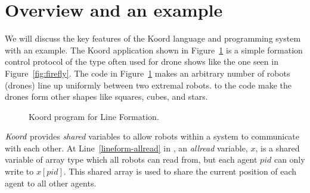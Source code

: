 \section{Overview and an example}
\label{sec:overview}

%

We will discuss the key features of the Koord language and programming system with an example. The Koord application shown in Figure~\ref{fig:lineform} is a simple  formation control protocol of the type often used for drone shows like the one seen in Figure~\ref{fig:firefly}. The code in Figure~\ref{fig:lineform} makes an arbitrary number of robots (drones) line up uniformly between two extremal robots.  to the code make the drones form other shapes like  squares, cubes, and stars. 

%



\begin{figure}[h!]
    {
        
    }
    {
        
    }
    \caption{Koord program for Line Formation.}\label{fig:lineform}
\end{figure}


$\emph{Koord}$ provides \emph{shared} variables to allow robots within a system to communicate with each other.
At Line~\ref{lineform-allread} in , an \emph{allread} variable, $x$, is a shared variable of array type which all robots can read from,
but each agent $pid$ can only write to $x[pid]$.
This shared array is used to share the current position of each agent to all other agents.

